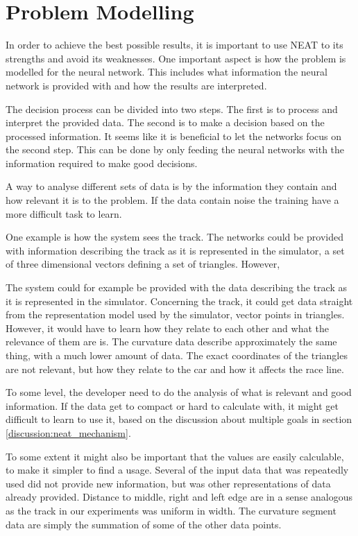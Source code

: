 \section{Problem Modelling}

In order to achieve the best possible results, it is important to use NEAT to its strengths and avoid its weaknesses. One important aspect is how the problem is modelled for the neural network. This includes what information the neural network is provided with and how the results are interpreted.  

The decision process can be divided into two steps. The first is to process and interpret the provided data. The second is to make a decision based on the processed information. It seems like it is beneficial to let the networks focus on the second step. This can be done by only feeding the neural networks with the information required to make good decisions. 


A way to analyse different sets of data is by the information they contain and how relevant it is to the problem. If the data contain noise the training have a more difficult task to learn.


One example is how the system sees the track. The networks could be provided with information describing the track as it is represented in the simulator, a set of three dimensional vectors defining a set of triangles. However, 



The system could for example be provided with the data describing the track as it is represented in the simulator. 
Concerning the track, it could get data straight from the representation model used by the simulator, vector points in triangles. However, it would have to learn how they relate to each other and what the relevance of them are is. The curvature data describe approximately the same thing, with a much lower amount of data. The exact coordinates of the triangles are not relevant, but how they relate to the car and how it affects the race line. 

To some level, the developer need to do the analysis of what is relevant and good information. If the data get to compact or hard to calculate with, it might get difficult to learn to use it, based on the discussion about multiple goals in section \ref{discussion:neat_mechanism}.

To some extent it might also be important that the values are easily calculable, to make it simpler to find a usage. Several of the input data that was repeatedly used did not provide new information, but was other representations of data already provided. Distance to middle, right and left edge are in a sense analogous as the track in our experiments was uniform in width. The curvature segment data are simply the summation of some of the other data points.

